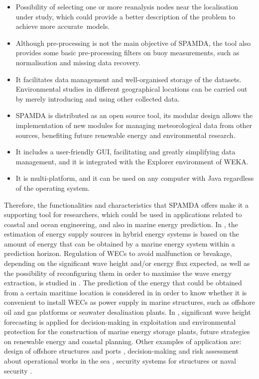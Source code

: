 \documentclass[energies,article,accept,moreauthors,pdftex]{Definitions/mdpi}
\begin{document}
\begin{itemize}
			\item Possibility of selecting one or more reanalysis nodes near the localisation under study, which could provide a better description of the problem to achieve more \mbox{accurate models.}
			
			\item Although pre-processing is not the main objective of SPAMDA, the tool also provides some basic pre-processing filters on buoy measurements, such as normalisation and missing data recovery.
			
			\item It facilitates data management and well-organised storage of the datasets. Environmental studies in different geographical locations can be carried out by merely introducing and using other collected data.
			
			\item SPAMDA is distributed as an open source tool, its modular design allows the implementation of new modules for managing meteorological data from other sources, benefiting future renewable energy and environmental research.
			
			\item It includes a user-friendly GUI, facilitating and greatly simplifying data management, and it is integrated with the Explorer environment of WEKA.
			
			\item It is multi-platform, and it can be used on any computer with Java regardless of the operating system.
		\end{itemize}
		
		Therefore, the functionalities and characteristics that SPAMDA offers make it a supporting tool for researchers, which could be used in applications related to coastal and ocean engineering, and also in marine energy prediction. In \cite{Kumar2020}, the estimation of energy supply sources in hybrid energy systems is based on the amount of energy that can be obtained by a marine energy system within a prediction horizon. Regulation of WECs to avoid malfunction or breakage, depending on the significant wave height and/or energy flux expected, as well as the possibility of reconfiguring them in order to maximise the wave energy extraction, is studied in \cite{CROWLEY2018159, Abdelkhalik2016}. The prediction of the energy that could be obtained from a certain maritime location is considered in \cite{OLIVEIRAPINTO2019556, FERNANDEZPRIETO2019546} in order to know whether it is convenient to install WECs as power supply in marine structures, such as offshore oil and gas platforms or seawater desalination plants. In \cite{Ali2019}, significant wave height forecasting is applied for decision-making in exploitation and environmental protection for the construction of marine energy storage plants, future strategies on renewable energy and coastal planning. Other examples of application are: design of offshore structures and ports \cite{CHATZIIOANNOU2017126}, decision-making and risk assessment about operational works in the sea \cite{DALGIC2015211}, security systems for structures or naval security \cite{Spaulding2020}.
					
\end{document}
